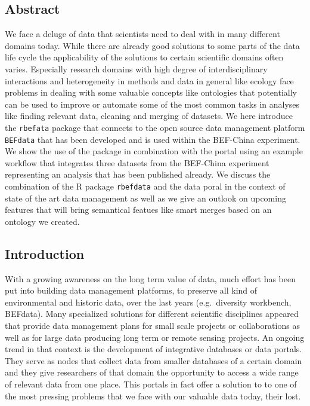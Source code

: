 \documentclass[]{article}
\author{}
\date{}
\begin{document}
\subsection{Abstract}

We face a deluge of data that scientists need to deal with in many
different domains today. While there are already good solutions to some
parts of the data life cycle the applicability of the solutions to
certain scientific domains often varies. Especially research domains
with high degree of interdisciplinary interactions and heterogeneity in
methods and data in general like ecology face problems in dealing with
some valuable concepts like ontologies that potentially can be used to
improve or automate some of the most common tasks in analyses like
finding relevant data, cleaning and merging of datasets. We here
introduce the \texttt{rbefata} package that connects to the open source
data management platform \texttt{BEFdata} that has been developed and is
used within the BEF-China experiment. We show the use of the package in
combination with the portal using an example workflow that integrates
three datasets from the BEF-China experiment representing an analysis
that has been published already. We discuss the combination of the R
package \texttt{rbefdata} and the data poral in the context of state of
the art data management as well as we give an outlook on upcoming
features that will bring semantical featues like smart merges based on
an ontology we created.

\subsection{Introduction}

With a growing awareness on the long term value of data, much effort has
been put into building data management platforms, to preserve all kind
of environmental and historic data, over the last years (e.g.~diversity
workbench, BEFdata). Many specialized solutions for different scientific
disciplines appeared that provide data management plans for small scale
projects or collaborations as well as for large data producing long term
or remote sensing projects. An ongoing trend in that context is the
development of integrative databases or data portals. They serve as
nodes that collect data from smaller databases of a certain domain and
they give researchers of that domain the opportunity to access a wide
range of relevant data from one place. This portals in fact offer a
solution to to one of the most pressing problems that we face with our
valuable data today, their lost.
\end{document}
